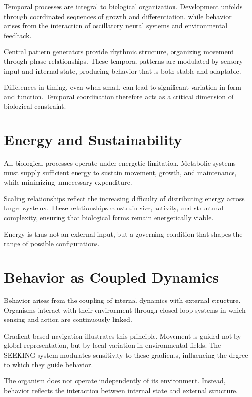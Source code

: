 \documentclass[11pt,oneside]{book}
\begin{document}
Temporal processes are integral to biological organization. Development unfolds through coordinated sequences of growth and differentiation, while behavior arises from the interaction of oscillatory neural systems and environmental feedback.

Central pattern generators provide rhythmic structure, organizing movement through phase relationships. These temporal patterns are modulated by sensory input and internal state, producing behavior that is both stable and adaptable.

Differences in timing, even when small, can lead to significant variation in form and function. Temporal coordination therefore acts as a critical dimension of biological constraint.

\section{Energy and Sustainability}

All biological processes operate under energetic limitation. Metabolic systems must supply sufficient energy to sustain movement, growth, and maintenance, while minimizing unnecessary expenditure.

Scaling relationships reflect the increasing difficulty of distributing energy across larger systems. These relationships constrain size, activity, and structural complexity, ensuring that biological forms remain energetically viable.

Energy is thus not an external input, but a governing condition that shapes the range of possible configurations.

\section{Behavior as Coupled Dynamics}

Behavior arises from the coupling of internal dynamics with external structure. Organisms interact with their environment through closed-loop systems in which sensing and action are continuously linked.

Gradient-based navigation illustrates this principle. Movement is guided not by global representation, but by local variation in environmental fields. The SEEKING system modulates sensitivity to these gradients, influencing the degree to which they guide behavior.

The organism does not operate independently of its environment. Instead, behavior reflects the interaction between internal state and external structure.
\end{document}
